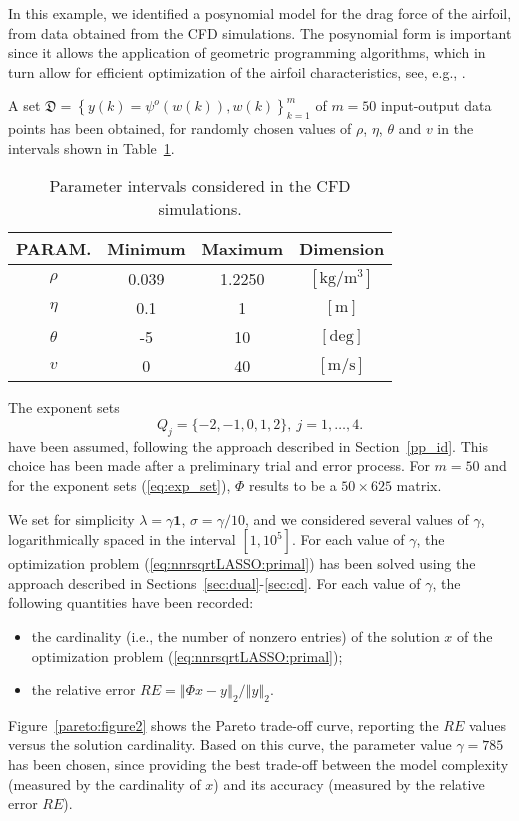 \documentclass[11pt]{article}
\newcommand{\one}{{\mathbf{1}}}
\newcommand{\lam}{\lambda}
\begin{document}
In this example, we identified a posynomial model for the drag force
of the airfoil, from data obtained from the CFD simulations. The posynomial
form is important since it allows the application of geometric programming
algorithms, which in turn allow for efficient optimization of the
airfoil characteristics, see, e.g., \cite{HoAb12}.


A set $\mathfrak{D}=\left\{ y(k)=\psi^{o}(w(k)),w(k)\right\} _{k=1}^{m}$
of $m=50$ input-output data points has been obtained, for randomly
chosen values of $\rho$, $\eta$, $\theta$ and $v$ in the intervals
shown in Table~\ref{tab_param}. 

\begin{table}[htb]
\centering

\begin{tabular}{|c|c|c|c|}
\hline 
PARAM.  & Minimum  & Maximum  & Dimension \tabularnewline
\hline 
$\rho$  & 0.039  & 1.2250  & $\mathrm{[kg/m^{3}]}$ \tabularnewline
\hline 
$\eta$  & 0.1  & 1  & $\mathrm{[m]}$ \tabularnewline
\hline 
$\theta$  & -5  & 10  & $\mathrm{[deg]}$ \tabularnewline
\hline 
$v$  & 0  & 40  & $\mathrm{[m/s]}$ \tabularnewline
\hline 
\end{tabular}\caption{Parameter intervals considered in the CFD simulations.}


\label{tab_param} 
\end{table}


The exponent sets 
\begin{equation}
Q_{j}=\{-2,-1,0,1,2\},\: j=1,\ldots,4.\label{eq:exp_set}
\end{equation}
have been assumed, following the approach described in Section~\ref{pp_id}.
This choice has been made after a preliminary trial and error process.
For $m=50$ and for the exponent sets (\ref{eq:exp_set}), $\Phi$
results to be a $50\times625$ matrix.

We set for simplicity $\lam=\gamma\one$, $\sigma=\gamma/10$, and
we considered several values of $\gamma$, logarithmically spaced
in the interval $[1,10^{5}]$. For each value of $\gamma$, the optimization
problem (\ref{eq:nnrsqrtLASSO:primal}) has been solved using the
approach described in Sections~\ref{sec:dual}-\ref{sec:cd}. For
each value of $\gamma$, the following quantities have been recorded:
\begin{itemize}
\item the cardinality (i.e., the number of nonzero entries) of the solution
$x$ of the optimization problem (\ref{eq:nnrsqrtLASSO:primal}); 
\item the relative error $RE=\left\Vert \Phi x-y\right\Vert _{2}/\left\Vert y\right\Vert _{2}$.
\end{itemize}
\noindent Figure~\ref{pareto:figure2} shows the Pareto trade-off curve,
reporting the $RE$ values versus the solution cardinality. Based
on this curve, the parameter value $\gamma=785$ has been chosen,
since providing the best trade-off between the model complexity (measured
by the cardinality of $x$) and its accuracy (measured by the relative
error $RE$).
\end{document}
